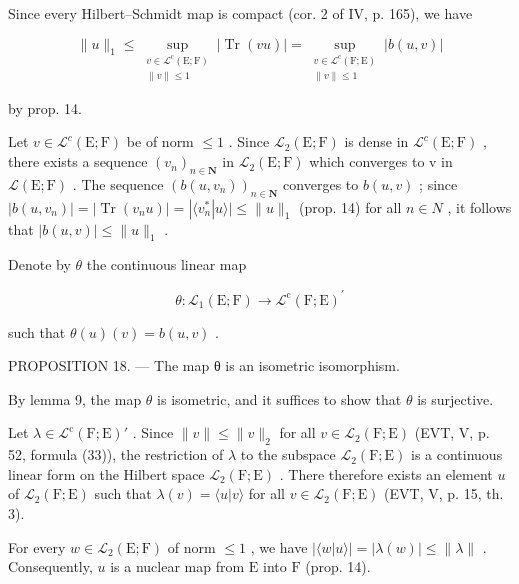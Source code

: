 Since every Hilbert--Schmidt map is compact (cor. 2 of IV, p. 165), we have

\[
\| u\|_{1}\leqslant \sup_{\substack{v\in \mathcal{L}^{\mathrm{c}}(\mathrm{E};\mathrm{F})\\ \| v\| \leqslant 1}}|\operatorname{Tr}(vu)| = \sup_{\substack{v\in \mathcal{L}^{\mathrm{c}}(\mathrm{F};\mathrm{E})\\ \| v\| \leqslant 1}}|b(u,v)|
\]

by prop. 14.

Let \(v \in \mathcal{L}^{c}(\mathrm{E};\mathrm{F})\) be of norm \(\leqslant 1\) . Since \(\mathcal{L}_{2}(\mathrm{E};\mathrm{F})\) is dense in \(\mathcal{L}^{c}(\mathrm{E};\mathrm{F})\) , there exists a sequence \((v_{n})_{n\in\mathbf{N}}\) in \(\mathcal{L}_{2}(\mathrm{E};\mathrm{F})\) which converges to v in \(\mathcal{L}(\mathrm{E};\mathrm{F})\) . The sequence \((b(u,v_{n}))_{n\in\mathbf{N}}\) converges to \(b(u,v)\) ; since \(|b(u,v_{n})| = |\operatorname{Tr}(v_{n}u)| = |\langle v_{n}^{*}|u\rangle| \leqslant \|u\|_{1}\) (prop. 14) for all \(n \in N\) , it follows that \(|b(u,v)| \leqslant \|u\|_{1}\) .

Denote by \(\theta\) the continuous linear map

\[
\theta \colon \mathcal {L} _ {1} (\mathrm{E}; \mathrm{F}) \to \mathcal {L} ^ {\mathrm{c}} (\mathrm{F}; \mathrm{E}) ^ {\prime}
\]

such that \(\theta(u)(v) = b(u,v)\) .

PROPOSITION 18. --- The map θ is an isometric isomorphism.

By lemma 9, the map \(\theta\) is isometric, and it suffices to show that \(\theta\) is surjective.

Let \(\lambda \in \mathcal{L}^{\mathrm{c}}(\mathrm{F};\mathrm{E})'\) . Since \(\| v\| \leqslant \| v\|_{2}\) for all \(v\in \mathcal{L}_2(\mathrm{F};\mathrm{E})\) (EVT, V, p. 52, formula (33)), the restriction of \(\lambda\) to the subspace \(\mathcal{L}_2(\mathrm{F};\mathrm{E})\) is a continuous linear form on the Hilbert space \(\mathcal{L}_2(\mathrm{F};\mathrm{E})\) . There therefore exists an element \(u\) of \(\mathcal{L}_2(\mathrm{F};\mathrm{E})\) such that \(\lambda (v) = \langle u|v\rangle\) for all \(v\in \mathcal{L}_2(\mathrm{F};\mathrm{E})\) (EVT, V, p. 15, th. 3).

For every \(w \in \mathcal{L}_2(\mathrm{E};\mathrm{F})\) of norm \(\leqslant 1\) , we have \(|\langle w|u\rangle| = |\lambda(w)| \leqslant \| \lambda \|\) . Consequently, \(u\) is a nuclear map from \(\mathrm{E}\) into \(\mathrm{F}\) (prop. 14).

